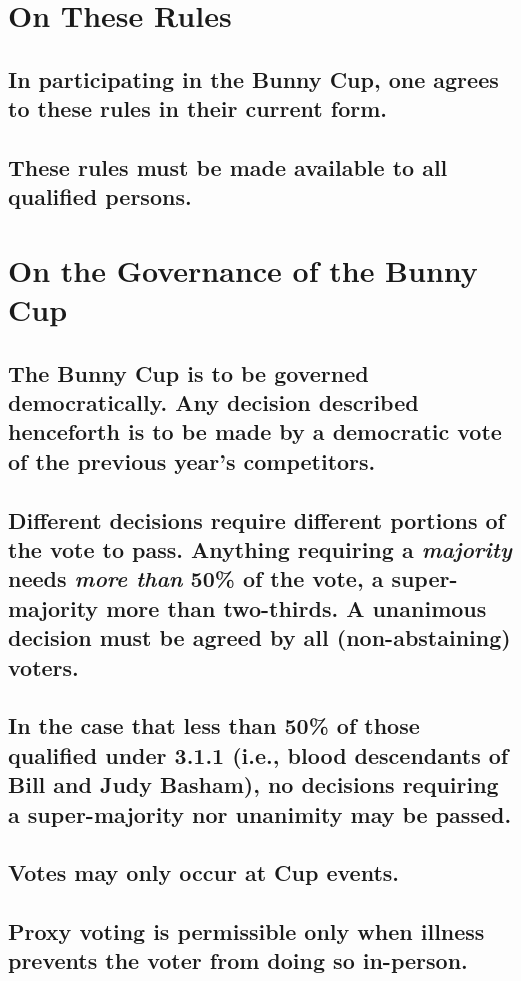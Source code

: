 \documentclass[a4paper]{article}
\begin{document}
\section{On These Rules}
\subsection{In participating in the Bunny Cup, one agrees to these rules in their current form.}
\subsection{These rules must be made available to all qualified persons.}



\section{On the Governance of the Bunny Cup}
\subsection{The Bunny Cup is to be governed democratically. Any decision described henceforth is to be made by a democratic vote of the previous year's competitors.}
\subsection{Different decisions require different portions of the vote to pass. Anything requiring a \emph{majority} needs \emph{more than} 50\% of the vote, a super-majority more than two-thirds. A unanimous decision must be agreed by all (non-abstaining) voters.}
\subsection{In the case that less than 50\% of those qualified under 3.1.1 (i.e., blood descendants of Bill and Judy Basham), no decisions requiring a super-majority nor unanimity may be passed.}\label{minforvote}
\subsection{Votes may only occur at Cup events.}
\subsection{Proxy voting is permissible only when illness prevents the voter from doing so in-person.}
\end{document}
